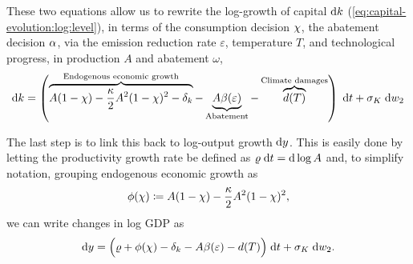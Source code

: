 \documentclass[../../main.tex]{subfiles}
\begin{document}
These two equations allow us to rewrite the log-growth of capital $\mathrm{d}k$ (\ref{eq:capital-evolution:log:level}), in terms of the consumption decision $\chi$, the abatement decision $\alpha$, via the emission reduction rate $\varepsilon$, temperature $T$, and technological progress, in production $A$ and abatement $\omega$, \begin{equation} \label{eq:capital-evolution:log:growth}
    \mathrm{d}k = \left( \overbrace{A (1 - \chi) - \frac{\kappa}{2} A^2 (1 - \chi)^2 - \delta_k}^{\text{Endogenous economic growth}} - \underbrace{A \beta(\varepsilon)}_{\text{Abatement}} - \overbrace{d(T)}^{\text{Climate damages}} \right) \; \mathrm{d}t + \sigma_K \; \mathrm{d}w_2
\end{equation} 

The last step is to link this back to log-output growth $\mathrm{d}y$. This is easily done by letting the productivity growth rate be defined as $\varrho \; \mathrm{d}t = \mathrm{d}\log A$ and, to simplify notation, grouping endogenous economic growth as \begin{equation}
    \phi(\chi) \coloneqq A (1 - \chi) - \frac{\kappa}{2} A^2 (1 - \chi)^2,
\end{equation} we can write changes in log GDP as \begin{equation} \label{eq:output-evolution:log}
    \mathrm{d}y = \Big(\varrho + \phi(\chi) - \delta_k - A \beta(\varepsilon) - d(T) \Big) \; \mathrm{d}t + \sigma_K \; \mathrm{d}w_2.
\end{equation}
\end{document}
